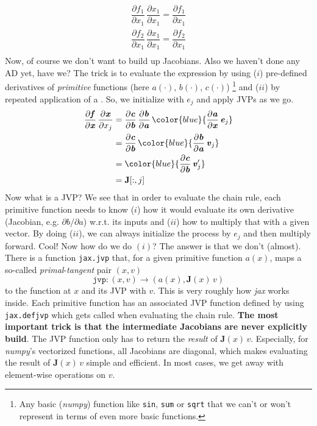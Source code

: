 \documentclass[paper=a4,11pt,headsepline]{scrartcl}
\newcommand{\ve}[1]{\ensuremath{\bm{\mathit{#1}}}}
\newcommand{\ma}[1]{\ensuremath{\bm{\mathbf{#1}}}}
\newcommand{\ra}{\ensuremath{\rightarrow}}
\newcommand{\pd}[2]{\dfrac{\partial #1}{\partial #2}}
\newcommand{\pdi}[2]{\partial #1/\partial #2}
\newcommand{\blue}[1]{{\color{blue}{#1}}}
\newcommand{\soft}[1]{\textsl{#1}\xspace}
\newcommand{\numpy}{\soft{numpy}}
\newcommand{\jax}{\soft{jax}}
\newcommand{\co}[1]{\texttt{#1}}
\begin{document}
\begin{gather*}
    \pd{f_1}{x_1}\,\pd{x_1}{x_1} = \pd{f_1}{x_1} \\
    \pd{f_2}{x_1}\,\pd{x_1}{x_1} = \pd{f_2}{x_1} \\
\end{gather*}
Now, of course we don't want to build up Jacobians. Also we haven't done any AD
yet, have we? The trick is to evaluate the expression by using ($i$)
pre-defined derivatives of \emph{primitive} functions (here $\ve a(\cdot)$,
$\ve b(\cdot)$, $\ve c(\cdot)$)%
\footnote{Any basic (\numpy) function like \co{sin}, \co{sum}
or \co{sqrt} that we can't or won't represent in terms of even more basic
functions.}
and ($ii$) by repeated application of a
\blue{\emph{Jacobian vector product (JVP)}}. So, we initialize with $\ve e_j$
and apply JVPs as we go.
\begin{align*}
    \pd{\ve f}{\ve x}\,\pd{\ve x}{x_j}
        &= \pd{\ve c}{\ve b}\,\pd{\ve b}{\ve a}\,\blue{\pd{\ve a}{\ve x}\,\ve e_j} \\
        &= \pd{\ve c}{\ve b}\,\blue{\pd{\ve b}{\ve a}\,\ve v_j} \\
        &= \blue{\pd{\ve c}{\ve b}\,\ve v_j'} \\
        &= \ma J[:,j]
\end{align*}
Now what is a JVP? We see that in order to evaluate the chain rule, each
primitive function
needs to know ($i$) how it would evaluate its own derivative (Jacobian, e.g.
$\pdi{\ve b}{\ve a}$) w.r.t. its inputs and ($ii$) how to multiply that with a
given vector. By doing ($ii$), we can always initialize the process by $\ve
e_j$ and then multiply forward. Cool! Now how do we do $(i)$? The answer is
that we don't (almost). There is a function \co{jax.jvp} that, for a given
primitive function $\ve a(\ve x)$, maps a so-called
\emph{primal}-\emph{tangent} pair $(\ve x, \ve v)$
\begin{equation*}
    \co{jvp}: (\ve x, \ve v) \ra \left(\ve a(\ve x), \ma J(\ve x)\,\ve v\right)
\end{equation*}
to the function at $\ve x$ and its JVP with $\ve v$. This is very roughly how
\jax works inside. Each primitive function has an associated
JVP function defined by using \co{jax.defjvp} which gets called when evaluating
the chain rule. \textbf{The most important trick is that the intermediate
Jacobians are never explicitly build}. The JVP function only has to return the
\emph{result} of $\ma J(\ve x)\,\ve v$. Especially, for \numpy's vectorized
functions, all Jacobians are diagonal, which makes evaluating the result of $\ma J(\ve x)\,\ve v$
simple and efficient. In most cases, we get away with element-wise operations
on \ve v.
\end{document}
